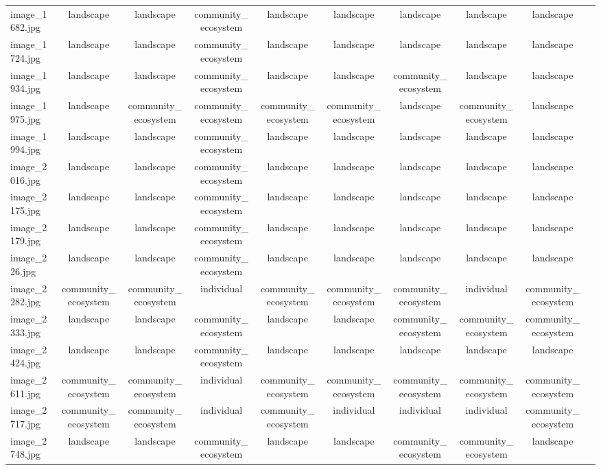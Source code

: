 \documentclass[hidelinks, 11pt]{article}
\begin{document}
\begin{longtable}{@{}lccccccccc@{}}
image\_1682.jpg  & landscape & landscape & community\_ecosystem & landscape & landscape & landscape & landscape & landscape \\
image\_1724.jpg  & landscape & landscape & community\_ecosystem & landscape & landscape & landscape & landscape & landscape \\
image\_1934.jpg  & landscape & landscape & community\_ecosystem & landscape & landscape & community\_ecosystem & landscape & landscape \\
image\_1975.jpg  & landscape & community\_ecosystem & community\_ecosystem & community\_ecosystem & community\_ecosystem & landscape & community\_ecosystem & landscape \\
image\_1994.jpg  & landscape & landscape & community\_ecosystem & landscape & landscape & landscape & landscape & landscape \\
image\_2016.jpg  & landscape & landscape & community\_ecosystem & landscape & landscape & landscape & landscape & landscape \\
image\_2175.jpg  & landscape & landscape & community\_ecosystem & landscape & landscape & landscape & landscape & landscape \\
image\_2179.jpg  & landscape & landscape & community\_ecosystem & landscape & landscape & landscape & landscape & landscape \\
image\_226.jpg   & landscape & landscape & community\_ecosystem & landscape & landscape & landscape & landscape & landscape \\
image\_2282.jpg  & community\_ecosystem & community\_ecosystem & individual & community\_ecosystem & community\_ecosystem & community\_ecosystem & individual & community\_ecosystem \\
image\_2333.jpg  & landscape & landscape & community\_ecosystem & landscape & landscape & community\_ecosystem & community\_ecosystem & community\_ecosystem \\
image\_2424.jpg  & landscape & landscape & community\_ecosystem & landscape & landscape & landscape & landscape & landscape \\
image\_2611.jpg  & community\_ecosystem & community\_ecosystem & individual & community\_ecosystem & community\_ecosystem & community\_ecosystem & community\_ecosystem & community\_ecosystem \\
image\_2717.jpg  & community\_ecosystem & community\_ecosystem & individual & community\_ecosystem & individual & individual & individual & community\_ecosystem \\
image\_2748.jpg  & landscape & landscape & community\_ecosystem & landscape & landscape & community\_ecosystem & community\_ecosystem & landscape \\

\end{longtable}
\end{document}
